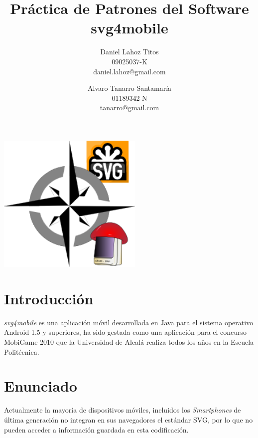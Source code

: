 \documentclass[a4paper,10pt]{article}
\begin{document}
\title{Práctica de Patrones del Software\\svg4mobile}

\author{Daniel Lahoz Titos\\09025037-K\\daniel.lahoz@gmail.com
\and Alvaro Tanarro Santamar\'ia\\01189342-N\\tanarro@gmail.com}

\maketitle

\begin{center}
 \includegraphics[height=6.7cm]{texres/logo.png}
\end{center}

\clearpage

\tableofcontents

\clearpage

\section{Introducción}
\textit{svg4mobile} es una aplicación móvil desarrollada en Java para el sistema operativo Android 1.5 y superiores, ha sido gestada como una aplicación para el concurso MobiGame 2010 que la Universidad de Alcalá realiza todos los años en la Escuela Politécnica.

\section{Enunciado}
Actualmente la mayoría de dispositivos móviles, incluidos los \textit{Smartphones} de última generación no integran en sus navegadores el estándar SVG, por lo que no pueden acceder a información guardada en esta codificación.
\end{document}
